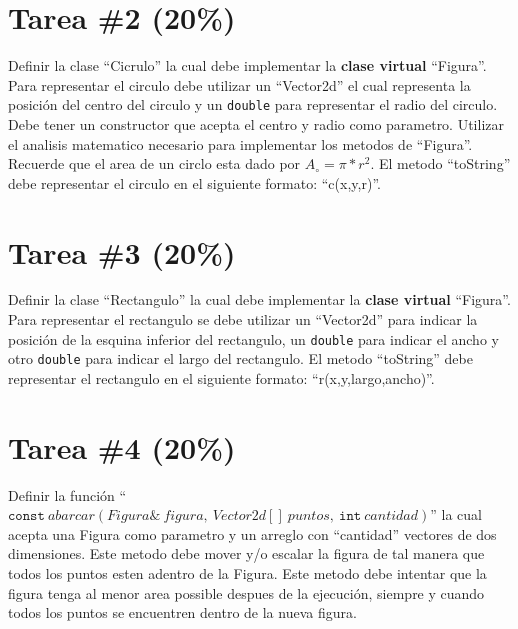 \documentclass{article}
\begin{document}
\section*{Tarea \#2 (20\%)}
Definir la clase ``Cicrulo'' la cual debe implementar la {\bf clase virtual} ``Figura''. Para representar
el circulo debe utilizar un ``Vector2d'' el cual representa la posici\'on del centro del circulo
y un \texttt{double} para representar el radio del circulo. Debe tener un constructor que acepta
el centro y radio como parametro. Utilizar el analisis matematico necesario para implementar
los metodos de ``Figura''. Recuerde que el area de un circlo esta dado por $A_{\circ}=\pi*r^2$. El
metodo ``toString'' debe representar el circulo en el siguiente formato: ``c(x,y,r)''.

\section*{Tarea \#3 (20\%)}
Definir la clase ``Rectangulo'' la cual debe implementar la {\bf clase virtual} ``Figura''. Para
representar el rectangulo se debe utilizar un ``Vector2d'' para indicar la posici\'on de la
esquina inferior del rectangulo, un \texttt{double} para indicar el ancho y otro \texttt{double}
para indicar el largo del rectangulo. El metodo ``toString'' debe representar el rectangulo
en el siguiente formato: ``r(x,y,largo,ancho)''.

\section*{Tarea \#4 (20\%)}
Definir la funci\'on ``$\mathtt{const}\ abarcar(Figura\&\ figura,\ Vector2d[]\ puntos,\ \mathtt{int}\ cantidad)$''
la cual acepta una Figura como parametro y un arreglo con ``cantidad'' vectores de dos dimensiones. Este metodo
debe mover y/o escalar la figura de tal manera que todos los puntos esten adentro de la Figura. Este metodo
debe intentar que la figura tenga al menor area possible despues de la ejecuci\'on, siempre y cuando
todos los puntos se encuentren dentro de la nueva figura.
\end{document}
